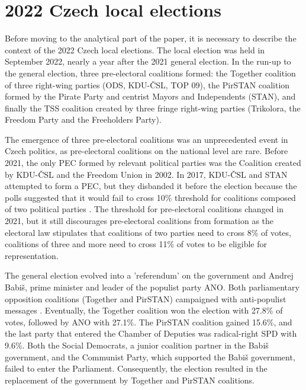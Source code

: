 \documentclass[]{interact}
\theoremstyle{plain}%
\theoremstyle{definition}
\theoremstyle{remark}
\begin{document}
\section{2022 Czech local elections}

Before moving to the analytical part of the paper, it is necessary to describe the context of the 2022 Czech local elections. The local election was held in September 2022, nearly a year after the 2021 general election. 
In the run-up to the general election, three pre-electoral coalitions formed: the Together coalition of three right-wing parties (ODS, KDU-ČSL, TOP 09), the PirSTAN coalition formed by the Pirate Party and centrist Mayors and Independents (STAN), and finally the TSS coalition created by three fringe right-wing parties (Trikolora, the Freedom Party and the Freeholders Party). 

The emergence of three pre-electoral coalitions was an unprecedented event in Czech politics, as pre-electoral coalitions on the national level are rare. Before 2021, the only PEC formed by relevant political parties was the Coalition created by KDU-ČSL and the Freedom Union in 2002. In 2017, KDU-ČSL and STAN attempted to form a PEC, but they disbanded it before the election because the polls suggested that it would fail to cross 10\% threshold for coalitions composed of two political parties \citep{silar2019}. The threshold for pre-electoral coalitions changed in 2021, but it still discourages pre-electoral coalitions from formation as the electoral law stipulates that coalitions of two parties need to cross 8\% of votes, coalitions of three and more need to cross 11\% of votes to be eligible for representation. 

The general election evolved into a 'referendum' on the government and Andrej Babiš, prime minister and leader of the populist party ANO. Both parliamentary opposition coalitions (Together and PirSTAN) campaigned with anti-populist messages \citep[c.f.][]{havlik2022,havlik2022b}. Eventually, the Together coalition won the election with 27.8\% of votes, followed by ANO with 27.1\%. The PirSTAN coalition gained 15.6\%, and the last party that entered the Chamber of Deputies was radical-right SPD with 9.6\%. Both the Social Democrats, a junior coalition partner in the Babiš government, and the Communist Party, which supported the Babiš government, failed to enter the Parliament. Consequently, the election resulted in the replacement of the government by Together and PirSTAN coalitions.
\end{document}
